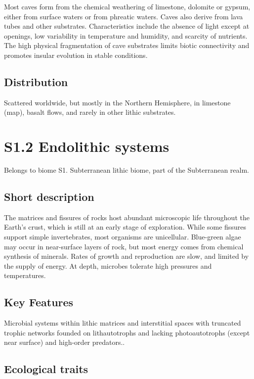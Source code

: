 \documentclass[
  letterpaper,
  DIV=11,
  numbers=noendperiod]{scrartcl}
\begin{document}
Most caves form from the chemical weathering of limestone, dolomite or
gypsum, either from surface waters or from phreatic waters. Caves also
derive from lava tubes and other substrates. Characteristics include the
absence of light except at openings, low variability in temperature and
humidity, and scarcity of nutrients. The high physical fragmentation of
cave substrates limits biotic connectivity and promotes insular
evolution in stable conditions.

\subsection{Distribution}\label{distribution-59}

Scattered worldwide, but mostly in the Northern Hemisphere, in limestone
(map), basalt flows, and rarely in other lithic substrates.

\section{S1.2 Endolithic systems}\label{s1.2-endolithic-systems}

Belongs to biome S1. Subterranean lithic biome, part of the Subterranean
realm.

\subsection{Short description}\label{short-description-60}

The matrices and fissures of rocks host abundant microscopic life
throughout the Earth's crust, which is still at an early stage of
exploration. While some fissures support simple invertebrates, most
organisms are unicellular. Blue-green algae may occur in near-surface
layers of rock, but most energy comes from chemical synthesis of
minerals. Rates of growth and reproduction are slow, and limited by the
supply of energy. At depth, microbes tolerate high pressures and
temperatures.

\subsection{Key Features}\label{key-features-60}

Microbial systems within lithic matrices and interstitial spaces with
truncated trophic networks founded on lithautotrophs and lacking
photoautotrophs (except near surface) and high-order predators..

\subsection{Ecological traits}\label{ecological-traits-60}
\end{document}
